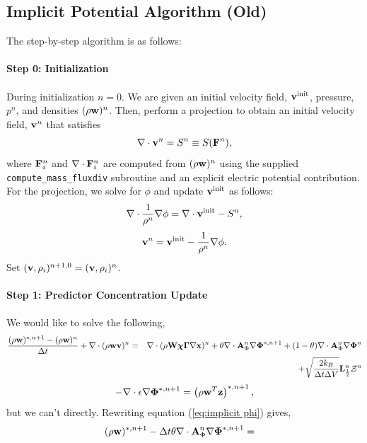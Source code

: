 \documentclass[final]{siamltex}
\def\Ab {{\bf A}}
\def\Fb {{\bf F}}
\def\Lb {{\bf L}}
\def\vb {{\bf v}}
\def\wb {{\bf w}}
\def\Wb {{\bf W}}
\def\xb {{\bf x}}
\def\zb {{\bf z}}
\def\chib   {\boldsymbol{\chi}}
\def\Gammab {\boldsymbol{\Gamma}}
\def\Phib   {\boldsymbol{\Phi}}
\def\half   {\frac{1}{2}}
\begin{document}
{\color{red}
\subsection{Implicit Potential Algorithm (Old)}
The step-by-step algorithm is as follows:\\ \\
{\bf Step 0: Initialization}\\ \\
During initialization $n=0$.
We are given an initial velocity field, $\vb^{\rm init}$, pressure, $p^n$,
and densities $(\rho\wb)^n$.
Then, perform a projection to obtain an initial velocity field, $\vb^n$ that satisfies
\begin{equation}
\nabla\cdot\vb^n = S^n \equiv S(\Fb^n),
\end{equation}
where $\Fb_i^n$ and $\nabla\cdot\Fb_i^n$ are computed from $(\rho\wb)^n$ using the 
supplied {\tt compute\_mass\_fluxdiv} subroutine and an explicit electric
potential contribution.
For the projection, we solve for $\phi$ and update $\vb^{\rm init}$ as follows:
\begin{equation}
\nabla\cdot\frac{1}{\rho^n}\nabla\phi = \nabla\cdot\vb^{\rm init} - S^n,
\end{equation}
\begin{equation}
\vb^n = \vb^{\rm init} - \frac{1}{\rho^n}\nabla\phi.
\end{equation}
Set $(\vb,\rho_i)^{n+1,0} = (\vb,\rho_i)^n$.\\ \\
{\bf Step 1: Predictor Concentration Update}\\ \\
We would like to solve the following,
\begin{eqnarray}
\frac{(\rho\wb)^{*,n+1} - (\rho\wb)^n}{\Delta t} + \nabla\cdot(\rho\wb\vb)^n &=&
\nabla\cdot(\rho\Wb\chib\Gammab\nabla\xb)^n + \theta\nabla\cdot \Ab_\Phi^n\nabla\Phib^{*,n+1} +
(1-\theta)\nabla\cdot \Ab_\Phi^n\nabla\Phib^n\nonumber\\
&&+ \sqrt{\frac{2k_B}{\Delta t\Delta V}}\Lb_\half^n\mathcal{Z}^n\label{eq:implicit phi}
\end{eqnarray}
\begin{equation}
-\nabla\cdot\epsilon\nabla\Phib^{*,n+1} = \left(\rho\wb^T\zb\right)^{*,n+1},\label{eq:constraint}
\end{equation}
but we can't directly.  Rewriting equation (\ref{eq:implicit phi}) gives,
\begin{eqnarray}
(\rho\wb)^{*,n+1} - \Delta t\theta\nabla\cdot \Ab_\Phi^n\nabla\Phib^{*,n+1} &=& \nonumber\\

\end{eqnarray}}
\end{document}
